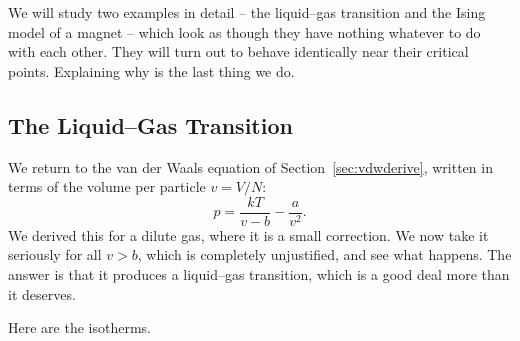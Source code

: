 We will study two examples in detail -- the liquid--gas transition and the Ising model of a magnet -- which look as though they have nothing whatever to do with each other. They will turn out to behave identically near their critical points. Explaining why is the last thing we do.

\subsection{The Liquid--Gas Transition}\label{sec:liquidgas}

We return to the van der Waals equation of Section~\ref{sec:vdwderive}, written in terms of the volume per particle $v = V/N$:
$$
p = \frac{kT}{v - b} - \frac{a}{v^2}.
$$
We derived this for a dilute gas, where it is a small correction. We now take it seriously for all $v > b$, which is completely unjustified, and see what happens. The answer is that it produces a liquid--gas transition, which is a good deal more than it deserves.

Here are the isotherms.

